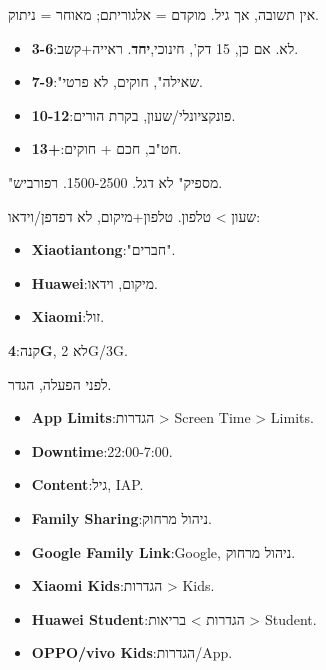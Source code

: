 


אין תשובה, אך גיל. מוקדם = אלגוריתם; מאוחר = ניתוק.

\begin{itemize}
  \item \textbf{3-6}:לא. אם כן, 15 דק', חינוכי,\textbf{יחד}. ראייה+קשב.
  \item \textbf{7-9}:"שאילה", חוקים, לא פרטי.
  \item \textbf{10-12}:פונקציונלי/שעון, בקרת הורים.
  \item \textbf{13+}:חט"ב, חכם + חוקים.
\end{itemize}

\begin{tcbinfo}{"מספיק"}
לא דגל. 1500-2500. רפורביש.

\end{tcbinfo}


שעון > טלפון. טלפון+מיקום, לא דפדפן/וידאו:

\begin{itemize}
  \item \textbf{Xiaotiantong}:"חברים".
  \item \textbf{Huawei}:מיקום, וידאו.
  \item \textbf{Xiaomi}:זול.
\end{itemize}

קנה:\textbf{4G}, לא 2G/3G.


לפני הפעלה, הגדר.


\begin{itemize}
  \item \textbf{App Limits}:הגדרות > Screen Time > Limits.
  \item \textbf{Downtime}:22:00-7:00.
  \item \textbf{Content}:גיל, IAP.
  \item \textbf{Family Sharing}:ניהול מרחוק.
\end{itemize}


\begin{itemize}
  \item \textbf{Google Family Link}:Google, ניהול מרחוק.
  \item \textbf{Xiaomi Kids}:הגדרות > Kids.
  \item \textbf{Huawei Student}:הגדרות > בריאות > Student.
  \item \textbf{OPPO/vivo Kids}:הגדרות/App.
\end{itemize}

